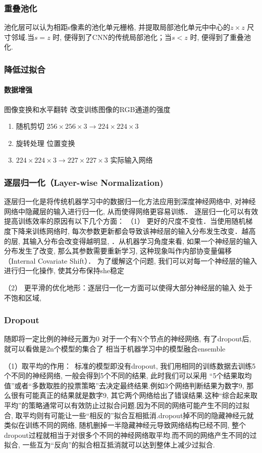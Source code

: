 \documentclass[a4paper]{article}
\begin{document}
\subsubsection{重叠池化}
池化层可以认为相距s像素的池化单元栅格, 并提取局部池化单元中中心的$z \times z$ 尺寸邻域.当$s=z$ 时, 便得到了CNN的传统局部池化；当$s<z$ 时, 便得到了重叠池化. 

\subsubsection{降低过拟合}
\paragraph{数据增强}
图像变换和水平翻转
改变训练图像的RGB通道的强度
\begin{enumerate}
    \item 随机剪切 $256 \times 256 \times 3  \to 224 \times 224 \times 3$ 
    \item 旋转处理 位置变换
    \item $224 \times 224 \times 3\to 227 \times 227 \times 3$  实际输入网络
\end{enumerate}

\subsubsection{逐层归一化（Layer-wise Normalization)}
逐层归一化是将传统机器学习中的数据归一化方法应用到深度神经网络中, 对神经网络中隐藏层的输入进行归一化, 从而使得网络更容易训练．
逐层归一化可以有效提高训练效率的原因有以下几个方面：
（1） 更好的尺度不变性．当使用随机梯度下降来训练网络时, 每次参数更新都会导致该神经层的输入分布发生改变．越高的层, 其输入分布会改变得越明显, ．从机器学习角度来看, 如果一个神经层的输入分布发生了改变, 那么其参数需要重新学习, 这种现象叫作内部协变量偏移（Internal Covariate Shift）． 
为了缓解这个问题, 我们可以对每一个神经层的输入进行归一化操作, 使其分布保持she稳定

（2） 更平滑的优化地形：逐层归一化一方面可以使得大部分神经层的输入
处于不饱和区域, 
\subsubsection{Dropout}
随即将一定比例的神经元置为0
对于一个有N个节点的神经网络, 有了dropout后, 就可以看做是2n个模型的集合了
相当于机器学习中的模型融合ensemble


（1）取平均的作用： 标准的模型即没有dropout, 我们用相同的训练数据去训练5个不同的神经网络, 一般会得到5个不同的结果, 此时我们可以采用 “5个结果取均值”或者“多数取胜的投票策略”去决定最终结果.例如3个网络判断结果为数字9, 那么很有可能真正的结果就是数字9, 其它两个网络给出了错误结果.这种“综合起来取平均”的策略通常可以有效防止过拟合问题.因为不同的网络可能产生不同的过拟合, 取平均则有可能让一些“相反的”拟合互相抵消.dropout掉不同的隐藏神经元就类似在训练不同的网络, 随机删掉一半隐藏神经元导致网络结构已经不同, 整个dropout过程就相当于对很多个不同的神经网络取平均.而不同的网络产生不同的过拟合, 一些互为“反向”的拟合相互抵消就可以达到整体上减少过拟合.
\end{document}
